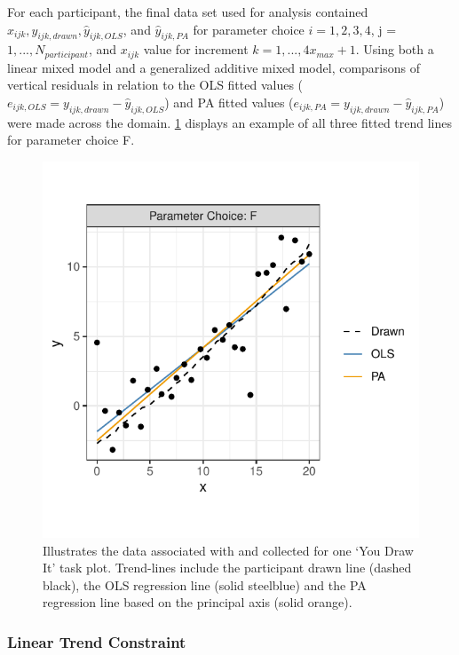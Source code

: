 \documentclass[12pt]{article}
\begin{document}
For each participant, the final data set used for analysis contained
\(x_{ijk}, y_{ijk,drawn}, \hat y_{ijk,OLS}\), and \(\hat y_{ijk,PA}\)
for parameter choice \(i = 1,2,3,4\), j = \(1,...,N_{participant}\), and
\(x_{ijk}\) value for increment \(k = 1, ...,4 x_{max} + 1\). Using both
a linear mixed model and a generalized additive mixed model, comparisons
of vertical residuals in relation to the OLS fitted values
(\(e_{ijk,OLS} = y_{ijk,drawn} - \hat y_{ijk,OLS}\)) and PA fitted
values (\(e_{ijk,PA} = y_{ijk,drawn} - \hat y_{ijk,PA}\)) were made
across the domain. \cref{fig:eyefitting-example-plot} displays an
example of all three fitted trend lines for parameter choice F.

\begin{figure}[tbp]

{\centering \includegraphics[width=0.5\linewidth,]{Eye-Fitting-Straight-Lines-in-the-Modern-Era_files/figure-latex/eyefitting-example-plot-1} 

}

\caption{Illustrates the data associated with and collected for one `You Draw It' task plot. Trend-lines include the participant drawn line (dashed black), the OLS regression line (solid steelblue) and the PA regression line based on the principal axis (solid orange).}\label{fig:eyefitting-example-plot}
\end{figure}

\hypertarget{linear-trend-constraint}{%
\subsubsection{Linear Trend Constraint}\label{linear-trend-constraint}}
\end{document}
